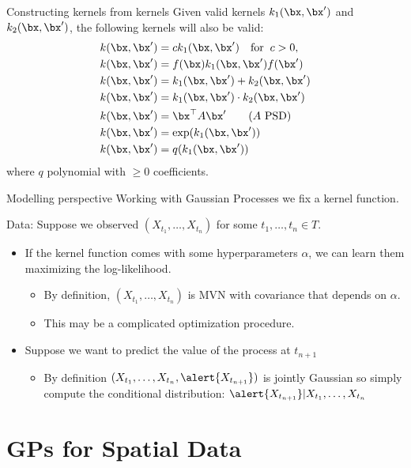 \documentclass[11pt,handout,aspectratio=169]{beamer}
\begin{document}
\begin{frame}{Constructing kernels from kernels}
Given valid kernels $k_1(\bx,\bx')$ and $k_2(\bx,\bx')$, the following kernels will also be valid:
\begin{align*}
	k(\bx,\bx')&=ck_1(\bx,\bx')\quad\mbox{for}\;\; c>0,\\
	k(\bx,\bx')&=f(\bx)k_1(\bx,\bx')f(\bx')\\
	k(\bx,\bx')&=k_1(\bx,\bx')+k_2(\bx,\bx')\\
	k(\bx,\bx')&=k_1(\bx,\bx')\cdot k_2(\bx,\bx')\\
	k(\bx,\bx')&=\bx^\top A\bx'\qquad (A\mbox{ PSD})\\
	k(\bx,\bx')&=\exp(k_1(\bx,\bx'))\\
	k(\bx,\bx')&=q(k_1(\bx,\bx'))
\end{align*}
where $q$ polynomial with $\geq 0$ coefficients. 
\end{frame}


\begin{frame}{Modelling perspective}
Working with Gaussian Processes we 	fix a kernel function.

Data: Suppose we observed $(X_{t_1},\ldots,X_{t_n})$ for some $t_1,\ldots,t_n\in T$. 

\begin{itemize}
	\item If the kernel function comes with some hyperparameters $\alpha$, we can learn them maximizing the log-likelihood.
	\begin{itemize}
	\item By definition, $(X_{t_1},\ldots,X_{t_n})$ is MVN with covariance that depends on $\alpha$. 
	\item This may be a complicated optimization procedure.\\[1cm]
	\end{itemize}
	\item Suppose we want to predict the value of the process at $t_{n+1}$
	\begin{itemize}
	\item By definition  $(X_{t_1},\ldots,X_{t_n},\alert{X_{t_{n+1}}})$ is jointly Gaussian so simply compute the conditional distribution: $\alert{X_{t_{n+1}}}|X_{t_1},\ldots, X_{t_n}$
\end{itemize}	
\end{itemize}


\end{frame}


\section{GPs for Spatial Data}
\end{document}
